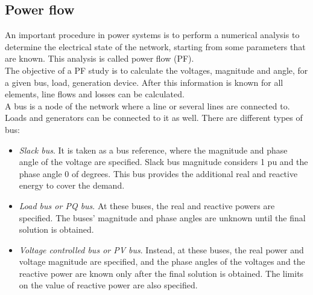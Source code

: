 \subsection{Power flow}
\label{ssec:powerflow}
An important procedure in power systems is to perform a numerical analysis to determine the electrical state of the network, starting from some parameters that are known. This analysis is called power flow (\gls{PF}).\\
The objective of a \gls{PF} study is to calculate the voltages, magnitude and angle, for a given bus, load, generation device. After this information is known for all elements, line flows and losses can be calculated.\\

A bus is a node of the network where a line or several lines are connected to. Loads and generators can be connected to it as well. There are different types of bus:
\begin{itemize}
    \item \emph{Slack bus}. It is taken as a bus reference, where the magnitude and phase angle of the voltage are specified. Slack bus magnitude considers 1 \gls{pu} and the phase angle 0 of degrees. This bus provides the additional real and reactive energy to cover the demand.

    \item \emph{Load bus or PQ bus}. At these buses, the real and reactive powers are specified. The buses' magnitude and phase angles are unknown until the final solution is obtained.

    \item \emph{Voltage controlled bus or PV bus}. Instead, at these buses, the real power and voltage magnitude are specified, and the phase angles of the voltages and the reactive power are known only after the final solution is obtained. The limits on the value of reactive power are also specified. 
\end{itemize}

